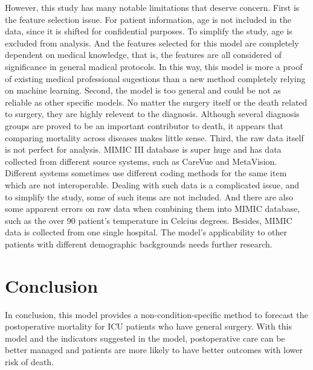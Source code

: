 \documentclass[twoside,11pt]{article}
\begin{document}
However, this study has many notable limitations that deserve concern. First is the feature selection issue. For patient information, age is not included in the data, since it is shifted for confidential purposes. To simplify the study, age is excluded from analysis. And the features selected for this model are completely dependent on medical knowledge, that is, the features are all considered of significance in general madical protocols. In this way, this model is more a proof of existing medical professional sugestions than a new method completely relying on machine learning. Second, the model is too general and could be not as reliable as other specific models. No matter the surgery itself or the death related to surgery, they are highly relevent to the diagnosis. Although several diagnosis groups are proved to be an important contributor to death, it appears that comparing mortality across diseases makes little sense. Third, the raw data itself is not perfect for analysis. MIMIC III database is super huge and has data collected from different source systems, such as CareVue and MetaVision. Different systems sometimes use different coding methods for the same item which are not interoperable. Dealing with such data is a complicated issue, and to simplify the study, some of such items are not included. And there are also some apparent errors on raw data when combining them into MIMIC database, such as the over 90 patient's temperature in Celcius degrees. Besides, MIMIC data is collected from one single hospital. The model's applicability to other patients with different demographic backgrounds needs further research.

\section{Conclusion} 
In conclusion, this model provides a non-condition-specific method to forecast the postoperative mortality for ICU patients who have general surgery. With this model and the indicators suggested in the model, postoperative care can be better managed and patients are more likely to have better outcomes with lower risk of death.



\end{document}
